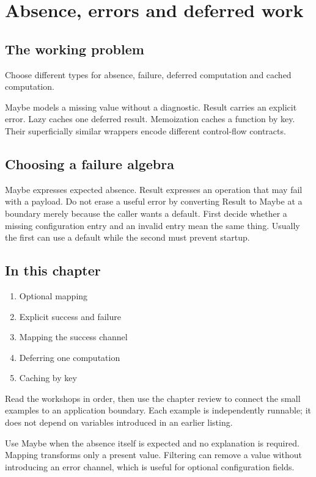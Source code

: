 \chapter{Absence, errors and deferred work}\label{ch:4}
\section*{The working problem}
Choose different types for absence, failure, deferred computation and cached computation.

Maybe models a missing value without a diagnostic. Result carries an explicit error. Lazy caches one deferred result. Memoization caches a function by key. Their superficially similar wrappers encode different control-flow contracts.

\section*{Choosing a failure algebra}
Maybe expresses expected absence. Result expresses an operation that may fail with a payload. Do not erase a useful error by converting Result to Maybe at a boundary merely because the caller wants a default. First decide whether a missing configuration entry and an invalid entry mean the same thing. Usually the first can use a default while the second must prevent startup.

\section*{In this chapter}
\begin{enumerate}
\item Optional mapping
\item Explicit success and failure
\item Mapping the success channel
\item Deferring one computation
\item Caching by key
\end{enumerate}
Read the workshops in order, then use the chapter review to connect the small examples to an application boundary. Each example is independently runnable; it does not depend on variables introduced in an earlier listing.

\clearpage
{}
Use Maybe when the absence itself is expected and no explanation is required. Mapping transforms only a present value. Filtering can remove a value without introducing an error channel, which is useful for optional configuration fields.

